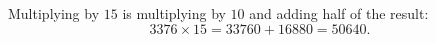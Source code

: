 Multiplying by $15$ is multiplying by $10$ and adding half of the result:
\[
3376\times15=33760+16880=\boxed{50640}.
\]
